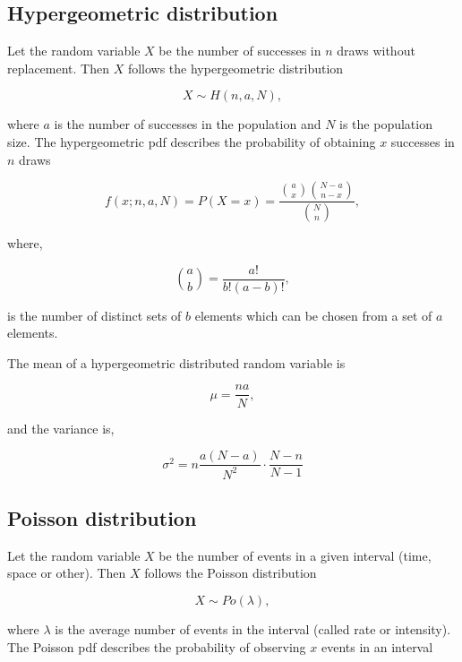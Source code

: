\subsection{Hypergeometric distribution}

Let the random variable $X$ be the number of successes in $n$ draws without replacement. Then $X$ follows the hypergeometric distribution

\begin{equation}
X \sim H(n, a, N),
\end{equation}

where $a$ is the number of successes in the population and $N$ is the population size. The hypergeometric pdf describes the probability of obtaining $x$ successes in $n$ draws

\begin{equation}
f(x;n,a,N) = P(X=x) = \frac{\binom{a}{x} \binom{N-a}{n-x}}{\binom{N}{n}},
\end{equation}

where,

\begin{equation}
\binom{a}{b} = \frac{a!}{b!(a-b)!},
\end{equation}

is the number of distinct sets of $b$ elements which can be chosen from a set of $a$ elements. 

The mean of a hypergeometric distributed random variable is

\begin{equation}
\mu = \frac{na}{N},
\end{equation}

and the variance is,

\begin{equation}
\sigma^2 = n\frac{a(N-a)}{N^2} \cdot \frac{N-n}{N-1}
\end{equation}

\subsection{Poisson distribution}

Let the random variable $X$ be the number of events in a given interval (time, space or other). Then $X$ follows the Poisson distribution

\begin{equation}
X \sim Po(\lambda),
\end{equation}

where $\lambda$ is the average number of events in the interval (called rate or intensity). The Poisson pdf describes the probability of observing $x$ events in an interval

